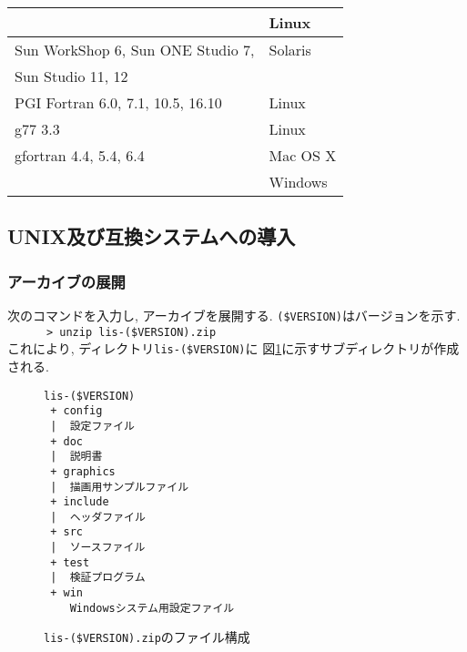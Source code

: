 \documentclass[a4paper]{jarticle}
\begin{document}
\begin{table}[htbp]
\begin{center}
{\begin{tabular}{l|l}
                                           & Linux   \\
\hline
Sun WorkShop 6, Sun ONE Studio 7,          & Solaris \\
Sun Studio 11, 12                          &         \\
\hline
PGI Fortran 6.0, 7.1, 10.5, 16.10          & Linux \\
\hline
g77 3.3                                    & Linux \\
gfortran 4.4, 5.4, 6.4                     & Mac OS X \\
                                           & Windows \\
\hline
\end{tabular}
}
\end{center}
\end{table} 

\subsection{UNIX及び互換システムへの導入}
\subsubsection{アーカイブの展開}
次のコマンドを入力し, アーカイブを展開する. \verb|($VERSION)|はバージョンを示す. \\
\verb&      > unzip lis-($VERSION).zip &\\
これにより, ディレクトリ{\tt lis-(\$VERSION)}に
図\ref{listargz}に示すサブディレクトリが作成される. 

\begin{figure}[htbp]
\begin{center}
\begin{verbatim}
lis-($VERSION)
 + config
 |  設定ファイル
 + doc
 |  説明書
 + graphics
 |  描画用サンプルファイル
 + include
 |  ヘッダファイル
 + src
 |  ソースファイル
 + test
 |  検証プログラム
 + win
    Windowsシステム用設定ファイル
\end{verbatim}
\end{center}
\caption{{\tt lis-(\$VERSION).zip}のファイル構成}
\label{listargz}
\end{figure}
\end{document}
